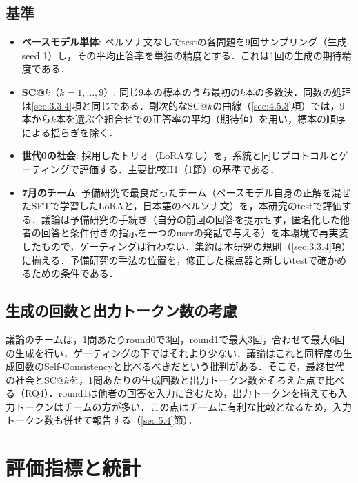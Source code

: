 \subsection{基準}
\label{sec:4.4.3}

\begin{itemize}
\item \textbf{ベースモデル単体}: ペルソナ文なしでtestの各問題を9回サンプリング（生成seed 1）し，その平均正答率を単独の精度とする．これは1回の生成の期待精度である．
\item \textbf{SC@$k$}（$k = 1, \dots, 9$）\cite{wang2023selfconsistency}: 同じ9本の標本のうち最初の$k$本の多数決．同数の処理は\ref{sec:3.3.4}項と同じである．副次的なSC@$k$の曲線（\ref{sec:4.5.3}項）では，9本から$k$本を選ぶ全組合せでの正答率の平均（期待値）を用い，標本の順序による揺らぎを除く．
\item \textbf{世代0の社会}: 採用したトリオ（LoRAなし）を，系統と同じプロトコルとゲーティングで評価する．主要比較H1（\ref{sec:4.5}節）の基準である．
\item \textbf{7月のチーム}: 予備研究で最良だったチーム（ベースモデル自身の正解を混ぜたSFTで学習したLoRAと，日本語のペルソナ文）を，本研究のtestで評価する．議論は予備研究の手続き（自分の前回の回答を提示せず，匿名化した他者の回答と条件付きの指示を一つのuserの発話で与える）を本環境で再実装したもので，ゲーティングは行わない．集約は本研究の規則（\ref{sec:3.3.4}項）に揃える．予備研究の手法の位置を，修正した採点器と新しいtestで確かめるための条件である．
\end{itemize}

\subsection{生成の回数と出力トークン数の考慮}
\label{sec:4.4.4}

議論のチームは，1問あたりround0で3回，round1で最大3回，合わせて最大6回の生成を行い，ゲーティングの下ではそれより少ない．議論はこれと同程度の生成回数のSelf-Consistencyと比べるべきだという批判がある\cite{smit2024should}．そこで，最終世代の社会とSC@$k$を，1問あたりの生成回数と出力トークン数をそろえた点で比べる（RQ4）．round1は他者の回答を入力に含むため，出力トークンを揃えても入力トークンはチームの方が多い．この点はチームに有利な比較となるため，入力トークン数も併せて報告する（\ref{sec:5.4}節）．

\section{評価指標と統計}
\label{sec:4.5}

